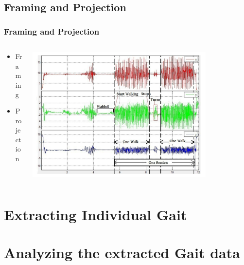 \documentclass{beamer}
\begin{document}
\subsection{Framing and Projection}
\begin{frame}
  \frametitle{Framing and Projection}
  \begin{columns}
  \begin{column}{0.4\textwidth}
  \begin{itemize}
  	\item Framing
  	\linebreak
	\item Projection
  \end{itemize}
  \end{column}
  \begin{column}{0.8\textwidth}
   \includegraphics[width=0.8\textwidth]{Illustrations/gaitpatterns.png}
       \\
  \end{column}
  \end{columns}
\end{frame}

\section[Gait Extraction]{Extracting Individual Gait}
	
\section[Gait Analysis]{Analyzing the extracted Gait data}
	
\end{document}
